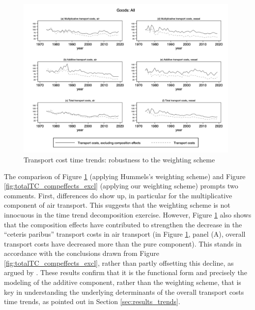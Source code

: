 \documentclass[a4paper,11pt]{article}
\begin{document}
\begin{figure}[htbp]
\caption{Transport cost time trends: robustness to the weighting scheme}
\label{fig:compeffects_robustness}
\begin{center}
\includegraphics[height=8cm]
{graph_composition_all_np.jpg}
\end{center}
\end{figure}

The comparison of Figure \ref{fig:compeffects_robustness} (applying Hummels's weighting scheme) and Figure \ref{fig:totalTC_compeffects_excl} (applying our weighting scheme) prompts two comments.
First, differences do show up, in particular for the multiplicative component of air transport.
This suggests that the weighting scheme is not innocuous in the time trend decomposition exercise.
However, Figure \ref{fig:compeffects_robustness} also shows that the composition effects have contributed to strengthen the decrease in the ``ceteris paribus'' transport costs in air transport (in Figure \ref{fig:compeffects_robustness}, panel (A), overall transport costs have decreased more than the pure component). This stands in accordance with the conclusions drawn from Figure \ref{fig:totalTC_compeffects_excl}, rather than partly offsetting this decline, as argued by \cite{hummels2007}. These results confirm that it is the functional form and precisely the modeling of the additive component, rather than the weighting scheme, that is key in understanding the underlying determinants of the overall transport costs time trends, as pointed out in Section \ref{sec:results_trends}.

\clearpage
\setcounter{table}{0}
\setcounter{figure}{0}
\renewcommand{\thefigure}{D.\arabic{figure}}
\renewcommand{\thetable}{D.\arabic{table}}
\end{document}
